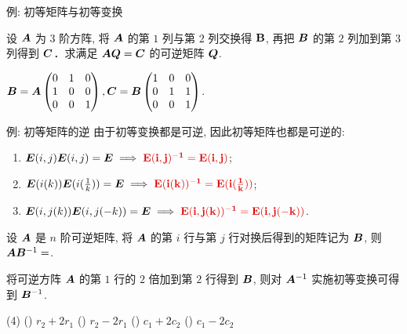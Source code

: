 \begin{frame}{例: 初等矩阵与初等变换}
	\onslide<+->
	\begin{example}
		设 ${\boldsymbol{A}}$ 为 $3$ 阶方阵, 将 ${\boldsymbol{A}}$ 的第 $1$ 列与第 $2$ 列交换得 $\bf	B$, 再把 ${\boldsymbol{B}}$ 的第 $2$ 列加到第 $3$ 列得到 ${\boldsymbol{C}}$．求满足 ${\boldsymbol{A}}{\boldsymbol{Q}}={\boldsymbol{C}}$ 的可逆矩阵 ${\boldsymbol{Q}}$.
	\end{example}
	\onslide<+->
	\begin{solution}
		${\boldsymbol{B}}={\boldsymbol{A}}\begin{pmatrix}
			0&1&0\\1&0&0\\0&0&1
		\end{pmatrix},{\boldsymbol{C}}={\boldsymbol{B}}\begin{pmatrix}
			1&0&0\\0&1&1\\0&0&1
		\end{pmatrix}$.
		\onslide<+->{因此
		\[\bfQ=\begin{pmatrix}
			0&1&0\\1&0&0\\0&0&1
		\end{pmatrix}\begin{pmatrix}
			1&0&0\\0&1&1\\0&0&1
		\end{pmatrix}=\begin{pmatrix}
			0&1&1\\1&0&0\\0&0&1
		\end{pmatrix}.\]}
	\end{solution}
\end{frame}


\begin{frame}{例: 初等矩阵的逆}
	\onslide<+->
	由于初等变换都是可逆, 因此初等矩阵也都是可逆的:
	\begin{enumerate}
		\item $\bfE(i,j)\bfE(i,j)=\bfE\implies \alert{\bfE(i,j)^{-1}=\bfE(i,j)}$;
		\item $\bfE(i(k))\bfE(i(\frac1k))=\bfE\implies\alert{\bfE(i(k))^{-1}=\bfE(i(\frac1k))}$;
		\item $\bfE(i,j(k))\bfE(i,j(-k))=\bfE\implies\alert{\bfE(i,j(k))^{-1}=\bfE(i,j(-k))}$.
	\end{enumerate}
	\onslide<+->
	\begin{example}
		设 ${\boldsymbol{A}}$ 是 $n$ 阶可逆矩阵, 将 ${\boldsymbol{A}}$ 的第 $i$ 行与第 $j$ 行对换后得到的矩阵记为 ${\boldsymbol{B}}$, 则 ${\boldsymbol{A}}{\boldsymbol{B}}^{-1}=$.
	\end{example}
	\onslide<+->
	\begin{exercise}
		将可逆方阵 ${\boldsymbol{A}}$ 的第 $1$ 行的 $2$ 倍加到第 $2$ 行得到 ${\boldsymbol{B}}$, 则对 ${\boldsymbol{A}}^{-1}$ 实施初等变换可得到 ${\boldsymbol{B}}^{-1}$.
		\begin{taskschoice}(4)
			() $r_2+2r_1$
			() $r_2-2r_1$
			() $c_1+2c_2$
			() $c_1-2c_2$
		\end{taskschoice}
	\end{exercise}
\end{frame}


